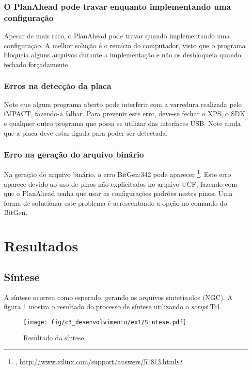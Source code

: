 \documentclass[11pt,a4paper,oneside]{book}
\begin{document}
\subsubsection{O PlanAhead pode travar enquanto implementando uma configuração}
Apesar de mais raro, o PlanAhead pode travar quando implementando uma configuração.
A melhor solução é o reinício do computador, visto que o programa bloqueia alguns arquivos durante a implementação e não os desbloqueia quando fechado forçadamente.

\subsubsection{Erros na detecção da placa}
Note que algum programa aberto pode interferir com a varredura realizada pelo iMPACT, fazendo-a falhar.
Para prevenir este erro, deve-se fechar o XPS, o SDK e qualquer outro programa que possa se utilizar das interfaces USB.
Note ainda que a placa deve estar ligada para poder ser detectada.

\subsubsection{Erro na geração do arquivo binário}
Na geração do arquivo binário, o erro BitGen:342 pode aparecer \footnote{, \url{http://www.xilinx.com/support/answers/51813.html}}.
Este erro aparece devido ao uso de pinos não explicitados no arquivo UCF, fazendo com que o PlanAhead tenha que usar as configurações padrões nestes pinos.
Uma forma de solucionar este problema é acrescentando a opção  no comando do BitGen. 

\section{Resultados}
\subsection{Síntese}
A síntese ocorreu como esperado, gerando os arquivos sintetisados (NGC).
A figura \ref{fig:ex1:sintese} mostra o resultado do processo de síntese utilizando o \textit{script} Tcl.
\begin{figure}[h]
\centering
\texttt{[image: fig/c3\_desenvolvimento/ex1/Sintese.pdf]}
\caption{Resultado da síntese.}
\label{fig:ex1:sintese}
\end{figure}
\end{document}
